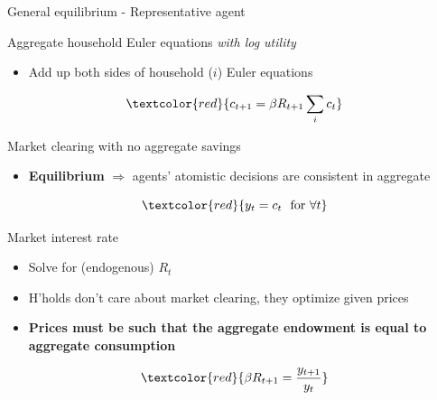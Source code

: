 \begin{frame}{General equilibrium - Representative agent}

Aggregate household Euler equations \emph{with log utility}
	\begin{itemize}
	\item	Add up both sides of household ($i$) Euler equations
	\end{itemize}
\begin{equation*}
\textcolor{red}{c_{t+1}=\beta R_{t+1}\sum_{i}c_{t}}
\end{equation*}

Market clearing with no aggregate savings
\begin{itemize}
\item	\textbf{Equilibrium} $\Rightarrow$ agents' atomistic decisions are consistent in aggregate
\end{itemize}
\begin{equation*}
\textcolor{red}{y_{t}=c_{t}\ \ \text{for }\forall t}
\end{equation*}

Market interest rate
\begin{itemize}
\item	Solve for (endogenous) $R_{t}$
\item	H'holds don't care about market clearing, they optimize given prices
\item	\textbf{Prices must be such that the aggregate endowment is equal to aggregate consumption}
\end{itemize}
\begin{equation*}
\textcolor{red}{\beta R_{t+1}=\frac{y_{t+1}}{y_{t}}}
\end{equation*}

\end{frame}


